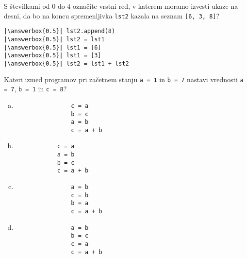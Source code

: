 \documentclass[arhiv, 10pt]{../izpit}
\newcommand{\inlinepy}[1]{\texttt{#1}}
\newcommand{\answerbox}[1]{\framebox{\vphantom{\large M}\hspace{#1cm}}}
\begin{document}
        \naloga*
        \begin{multicols}{2}
        \noindent 
        S številkami od $0$ do $4$ označite vrstni red, v katerem moramo izvesti ukaze na desni, da bo na koncu spremenljivka \inlinepy{lst2} kazala na seznam \inlinepy{[6, 3, 8]}?
    
        \columnbreak
        \noindent
        \begin{verbatim}
|\answerbox{0.5}| lst2.append(8)
|\answerbox{0.5}| lst2 = lst1
|\answerbox{0.5}| lst1 = [6]
|\answerbox{0.5}| lst1 = [3]
|\answerbox{0.5}| lst2 = lst1 + lst2

        \end{verbatim}
        \end{multicols}
    
            
        \naloga*
        
        Kateri izmed programov pri začetnem stanju
            \inlinepy{a = 1} in
            \inlinepy{b = 7}
        nastavi vrednosti
            \inlinepy{a = 7},
            \inlinepy{b = 1} in
            \inlinepy{c = 8}?
    
        \begin{multicols}{4}
        \begin{enumerate}[(a)]
\item 
                \begin{verbatim}
                c = a
                b = c
                a = b
                c = a + b
                \end{verbatim}
            
\item 
            \begin{verbatim}
            c = a
            a = b
            b = c
            c = a + b
            \end{verbatim}
        
\item 
                \begin{verbatim}
                a = b
                c = b
                b = a
                c = a + b
                \end{verbatim}
            
\item 
                \begin{verbatim}
                a = b
                b = c
                c = a
                c = a + b
                \end{verbatim}
            
\end{enumerate}

        \end{multicols}
    
\end{document}
